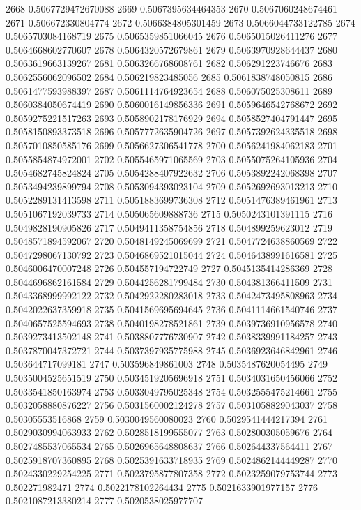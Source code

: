 2668 0.5067729472670088
2669 0.5067395634464353
2670 0.5067060248674461
2671 0.506672330804774
2672 0.5066384805301459
2673 0.5066044733122785
2674 0.5065703084168719
2675 0.5065359851066045
2676 0.5065015026411276
2677 0.5064668602770607
2678 0.5064320572679861
2679 0.5063970928644437
2680 0.5063619663139267
2681 0.5063266768608761
2682 0.506291223746676
2683 0.5062556062096502
2684 0.506219823485056
2685 0.5061838748050815
2686 0.5061477593988397
2687 0.5061114764923654
2688 0.506075025308611
2689 0.5060384050674419
2690 0.5060016149856336
2691 0.5059646542768672
2692 0.5059275221517263
2693 0.5058902178176929
2694 0.5058527404791447
2695 0.5058150893373518
2696 0.5057772635904726
2697 0.5057392624335518
2698 0.5057010850585176
2699 0.5056627306541778
2700 0.5056241984062183
2701 0.5055854874972001
2702 0.5055465971065569
2703 0.5055075264105936
2704 0.5054682745824824
2705 0.5054288407922632
2706 0.5053892242068398
2707 0.5053494239899794
2708 0.5053094393023104
2709 0.5052692693013213
2710 0.5052289131413598
2711 0.5051883699736308
2712 0.5051476389461961
2713 0.5051067192039733
2714 0.505065609888736
2715 0.5050243101391115
2716 0.5049828190905826
2717 0.5049411358754856
2718 0.504899259623012
2719 0.5048571894592067
2720 0.5048149245069699
2721 0.5047724638860569
2722 0.5047298067130792
2723 0.5046869521015044
2724 0.5046438991616581
2725 0.5046006470007248
2726 0.504557194722749
2727 0.5045135414286369
2728 0.5044696862161584
2729 0.5044256281799484
2730 0.504381366411509
2731 0.5043368999992122
2732 0.5042922280283018
2733 0.5042473495808963
2734 0.5042022637359918
2735 0.5041569695694645
2736 0.5041114661540746
2737 0.5040657525594693
2738 0.5040198278521861
2739 0.5039736910956578
2740 0.5039273413502148
2741 0.5038807776730907
2742 0.5038339991184257
2743 0.5037870047372721
2744 0.5037397935775988
2745 0.5036923646842961
2746 0.503644717099181
2747 0.503596849861003
2748 0.5035487620054495
2749 0.5035004525651519
2750 0.5034519205696918
2751 0.5034031650456066
2752 0.5033541850163974
2753 0.5033049795025348
2754 0.5032555475214661
2755 0.5032058880876227
2756 0.5031560002124278
2757 0.5031058829043037
2758 0.50305553516868
2759 0.5030049560080023
2760 0.5029541444217394
2761 0.5029030994063933
2762 0.5028518199555077
2763 0.502800305059676
2764 0.5027485537065534
2765 0.5026965648808637
2766 0.502644337564411
2767 0.5025918707360895
2768 0.5025391633718935
2769 0.5024862144449287
2770 0.5024330229254225
2771 0.5023795877807358
2772 0.5023259079753744
2773 0.502271982471
2774 0.5022178102264434
2775 0.5021633901977157
2776 0.5021087213380214
2777 0.5020538025977707
